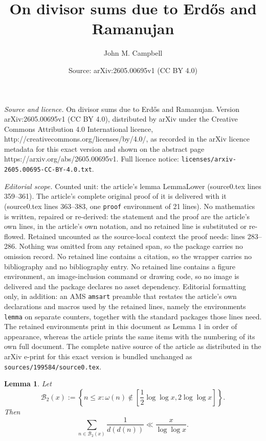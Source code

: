 \documentclass[10pt,a4paper]{amsart}
\title{On divisor sums due to Erd\H{o}s and Ramanujan}
\author{John M. Campbell}
\date{Source: arXiv:2605.00695v1 (CC BY 4.0)}
\newtheorem{lemma}{Lemma}
\begin{document}
\maketitle

\noindent\emph{Source and licence.} On divisor sums due to Erd\H{o}s and Ramanujan. Version arXiv:2605.00695v1 (CC BY 4.0), distributed by arXiv under the Creative Commons Attribution 4.0 International licence, http://creativecommons.org/licenses/by/4.0/, as recorded in the arXiv licence metadata for this exact version and shown on the abstract page https://arxiv.org/abs/2605.00695v1. Full licence notice: \texttt{licenses/arxiv-2605.00695-CC-BY-4.0.txt}.\par\smallskip

\noindent\textit{Editorial scope.} Counted unit: the article's lemma LemmaLower (source0.tex lines 359--361). The article's complete original proof of it is delivered with it (source0.tex lines 363--383, one \texttt{proof} environment of 21 lines). No mathematics is written, repaired or re-derived: the statement and the proof are the article's own lines, in the article's own notation, and no retained line is substituted or re-flowed.  Retained uncounted as the source-local context the proof needs: lines 283--286.  Nothing was omitted from any retained span, so the package carries no omission record.  No retained line contains a citation, so the wrapper carries no bibliography and no bibliography entry.  No retained line contains a figure environment, an image-inclusion command or drawing code, so no image is delivered and the package declares no asset dependency.  Editorial formatting only, in addition: an AMS \texttt{amsart} preamble that restates the article's own declarations and macros used by the retained lines, namely the environments \texttt{lemma} on separate counters, together with the standard packages those lines need.  The retained environments print in this document as Lemma 1 in order of appearance, whereas the article prints the same items with the numbering of its own full document.  The complete native source of the article as distributed in the arXiv e-print for this exact version is bundled unchanged as \texttt{sources/199584/source0.tex}.
\begin{lemma}\label{LemmaB2}
Let $$ \mathcal{B}_2(x) := \left\{n \leq x:\omega(n) \notin \left[\frac12\log\log x,2\log\log x\right]\right\}. $$ Then $$ \sum_{n \in 
 \mathcal{B}_2(x)} \frac{1}{d(d(n))} \ll \frac{x}{\log\log x}. $$
\end{lemma}
\end{document}
